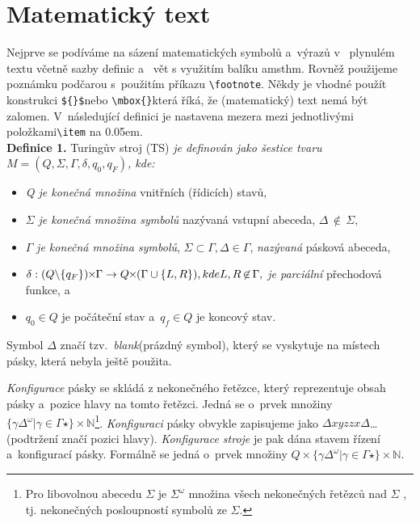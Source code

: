 \documentclass[11pt, titlepage, a4paper, twocolumn]{article}
\begin{document}
\section{Matematický text} 
Nejprve se podíváme na sázení matematických symbolů a~výrazů v~ plynulém textu včetně sazby definic a~ vět s využitím balíku amsthm. Rovněž použijeme poznámku podčarou s~použitím příkazu \verb|\footnote|. Někdy je vhodné použít konstrukci \verb|${}$|nebo \verb|\mbox{}|která říká, že (matematický) text nemá být zalomen. V~následující definici je nastavena mezera mezi jednotlivými položkami\verb|\item| na 0.05em.\\[0.4em]
\textbf{Definice 1.}\label{def_1} Turingův stroj (TS) \emph{je definován jako šestice tvaru ${M = (Q, \Sigma,\Gamma, \delta, q_0, q_F)}$, kde:}
\begin{itemize}\itemsep=0.05em
\item \emph{Q je konečná množina} vnitřních (řídicích) stavů,
\item ${\Sigma}$ \emph{je konečná množina symbolů} nazývaná vstupní abeceda, ${\Delta \,{\not \in}\,\Sigma,}$ 
\item ${\Gamma}$ \emph{je konečná množina symbolů}, ${\Sigma \subset \Gamma, \Delta \in \Gamma}$, \emph{nazývaná} pásková abeceda,
\item ${\delta: (Q\backslash \{q_F\})\hspace{-1mm}\times\hspace{-1mm} \Gamma\rightarrow Q\hspace{-1mm}\times\hspace{-1mm}(\Gamma \cup \{L,R\}), kde L,R\,{\not \in}\,\Gamma,}$ \emph{je parciální} přechodová funkce, a
\item ${q_0 \in Q}$ je počáteční stav a~${q_f \in Q}$ je koncový stav.
\end{itemize}

Symbol ${\Delta}$ značí tzv.\, \emph{blank}(prázdný symbol), který se vyskytuje na místech pásky, která nebyla ještě použita.\par \emph{Konfigurace} pásky se skládá z nekonečného řetězce, který reprezentuje obsah pásky a~pozice hlavy na tomto řetězci. Jedná se o~prvek množiny ${\{\gamma \Delta^\omega | \gamma \in \Gamma \star\} \times \mathbb{N}}$\footnote{Pro libovolnou abecedu $\Sigma$ je $\Sigma ^\omega$ množina všech nekonečných řetězců nad $\Sigma$ , tj. nekonečných posloupností symbolů ze $\Sigma$.}. \emph{Konfiguraci} pásky obvykle zapisujeme jako ${\Delta xyzzx \Delta}$\dots (podtržení značí pozici hlavy). \emph{Konfigurace stroje} je pak dána stavem řízení a~konfigurací pásky. Formálně se jedná o~prvek množiny ${Q\times\{\gamma \Delta^ \omega | \gamma \in \Gamma \star \} \times \mathbb{N}}$.
\end{document}
